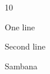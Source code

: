 \documentclass{article}
\begin{document}
\begin{copies}{10}

One line

Second line


Sambana

\end{copies}
\end{document}
